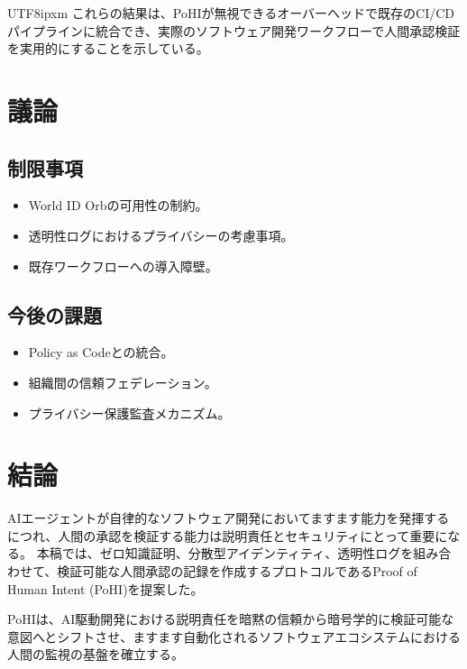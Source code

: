 \documentclass[a4paper,10pt]{article}
\begin{document}
\begin{CJK}{UTF8}{ipxm}
これらの結果は、PoHIが無視できるオーバーヘッドで既存のCI/CDパイプラインに統合でき、実際のソフトウェア開発ワークフローで人間承認検証を実用的にすることを示している。

\section{議論}

\subsection{制限事項}

\begin{itemize}
    \item World ID Orbの可用性の制約。
    \item 透明性ログにおけるプライバシーの考慮事項。
    \item 既存ワークフローへの導入障壁。
\end{itemize}

\subsection{今後の課題}

\begin{itemize}
    \item Policy as Codeとの統合。
    \item 組織間の信頼フェデレーション。
    \item プライバシー保護監査メカニズム。
\end{itemize}

\section{結論}

AIエージェントが自律的なソフトウェア開発においてますます能力を発揮するにつれ、人間の承認を検証する能力は説明責任とセキュリティにとって重要になる。
本稿では、ゼロ知識証明、分散型アイデンティティ、透明性ログを組み合わせて、検証可能な人間承認の記録を作成するプロトコルであるProof of Human Intent (PoHI)を提案した。

PoHIは、AI駆動開発における説明責任を暗黙の信頼から暗号学的に検証可能な意図へとシフトさせ、ますます自動化されるソフトウェアエコシステムにおける人間の監視の基盤を確立する。


\end{CJK}
\end{document}
